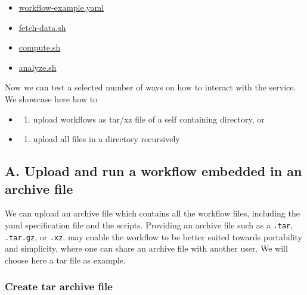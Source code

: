 \begin{itemize}
\tightlist
\item
  \href{https://github.com/cloudmesh/cloudmesh-cc/blob/main/tests/workflow-example/workflow-example.yaml}{workflow-example.yaml}
\item
  \href{https://github.com/cloudmesh/cloudmesh-cc/blob/main/tests/workflow-example/fetch-data.sh}{fetch-data.sh}
\item
  \href{https://github.com/cloudmesh/cloudmesh-cc/blob/main/tests/workflow-example/compute.sh}{compute.sh}
\item
  \href{https://github.com/cloudmesh/cloudmesh-cc/blob/main/tests/workflow-example/analyze.sh}{analyze.sh}
\end{itemize}

Now we can test a selected number of ways on how to interact with the
service. We showcase here how to

\begin{itemize}
\item
  \begin{enumerate}
  \def\labelenumi{\Alph{enumi}.}
  \tightlist
  \item
    upload workflows as tar/xz file of a self containing directory, or
  \end{enumerate}
\item
  \begin{enumerate}
  \def\labelenumi{\Alph{enumi}.}
  \setcounter{enumi}{1}
  \tightlist
  \item
    upload all files in a directory recursively
  \end{enumerate}
\end{itemize}

\subsection{A. Upload and run a workflow embedded in an archive
file}\label{a.-upload-and-run-a-workflow-embedded-in-an-archive-file}

We can upload an archive file which contains all the workflow files,
including the yaml specification file and the scripts. Providing an
archive file such as a \texttt{.tar}, \texttt{.tar.gz}, or \texttt{.xz}.
may enable the workflow to be better suited towards portability and
simplicity, where one can share an archive file with another user. We
will choose here a tar file as example.

\subsubsection{Create tar archive file}\label{create-tar-archive-file}

